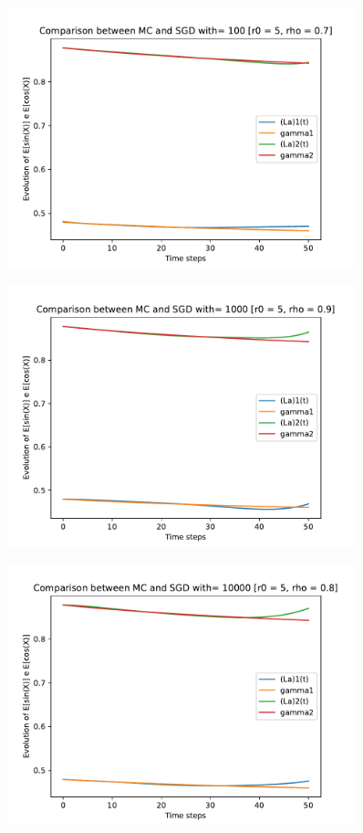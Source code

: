\documentclass[a4paper,11pt,openright]{report}
\begin{document}
\begin{figure}[H]
\centering
\includegraphics[width=0.9\textwidth]{images/graphics T = 0.5/n = 6, M = 100 sine and cosine.pdf}
\end{figure}
\begin{figure}[H]
\centering
\includegraphics[width=0.9\textwidth]{images/graphics T = 0.5/n = 6, M = 1000 sine and cosine.pdf}
\end{figure}
\begin{figure}[H]
\centering
\includegraphics[width=0.9\textwidth]{images/graphics T = 0.5/n = 6, M = 10000 sine and cosine.pdf}
\end{figure}
\newpage
\end{document}
